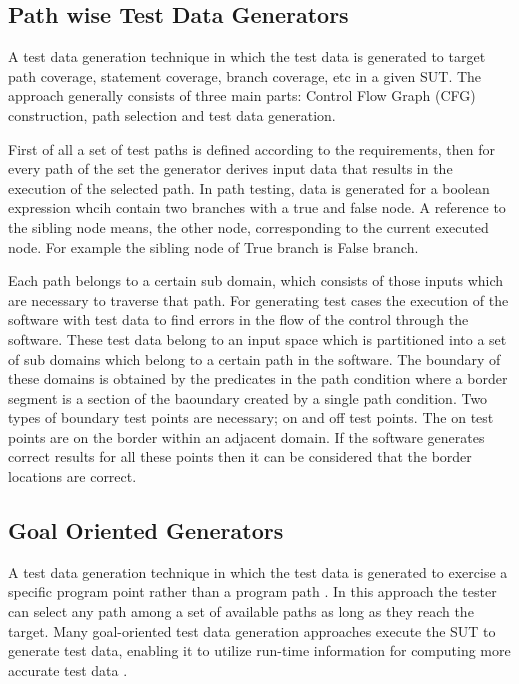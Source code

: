 \subsection{Path wise Test Data Generators}
A test data generation technique in which the test data is generated to target path coverage, statement coverage, branch coverage, etc in a given SUT. The approach generally consists of three main parts: Control Flow Graph (CFG) construction, path selection and test data generation. 

First of all a set of test paths is defined according to the requirements, then for every path of the set the generator derives input data that results in the execution of the selected path.  In path testing, data is generated for a boolean expression whcih contain two branches with a true and false node. A reference to the sibling node means, the other node, corresponding to the current executed node. For example the sibling node of True branch is False branch.

Each path belongs to a certain sub domain, which consists of those inputs which are necessary to traverse that path. For generating test cases the execution of the software with test data to find errors in the flow of the control through the software. These test data belong to an input space which is partitioned into a set of sub domains which belong to a certain path in the software. The boundary of these domains is obtained by the predicates in the path condition where a border segment is a section of the baoundary created by a single path condition. Two types of boundary test points are necessary; on and off test points. The on test points are on the border within an adjacent domain. If the software generates correct results for all these points then it can be considered that the border locations are correct.



\subsection{Goal Oriented Generators}
A test data generation technique in which the test data is generated to exercise a specific program point rather than a program path \cite{chungautomated}.  In this approach the tester can select any path among a set of available paths as long as they reach the target. Many goal-oriented test data generation approaches execute the SUT to generate test data, enabling it to utilize run-time information for computing more accurate test data \cite{ferguson1996chaining}.

